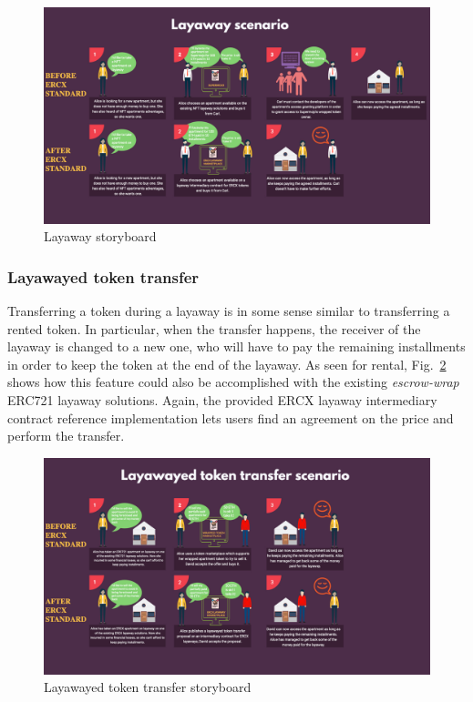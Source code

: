 \documentclass[english, LaM, oneside]{sapthesis}%
\begin{document}
\begin{figure}[H]
    \centering
        \begin{adjustbox}{width=1\textwidth}
            \includegraphics{storyboards/layaway.pdf}
        \end{adjustbox}
    \caption{Layaway storyboard}
    \label{fig:Layaway SB}
\end{figure}



\subsubsection{Layawayed token transfer}

Transferring a token during a layaway is in some sense similar to transferring a rented token. In particular, when the transfer happens, the receiver of the layaway is changed to a new one, who will have to pay the remaining installments in order to keep the token at the end of the layaway. \newline
As seen for rental, Fig.~\ref{fig:LayawayedTokenTransfer SB} shows how this feature could also be accomplished with the existing \textit{escrow-wrap} ERC721 layaway solutions. Again, the provided ERCX layaway intermediary contract reference implementation lets users find an agreement on the price and perform the transfer.

\begin{figure}[H]
    \centering
        \begin{adjustbox}{width=1\textwidth}
            \includegraphics{storyboards/layawayedTokenTransfer.pdf}
        \end{adjustbox}
    \caption{Layawayed token transfer storyboard}
    \label{fig:LayawayedTokenTransfer SB}
\end{figure}
\end{document}
